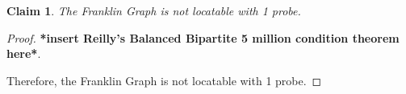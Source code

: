 \documentclass[11pt]{article}
\newtheorem{clm}{Claim}
\begin{document}
	\begin{clm}
		The Franklin Graph is not locatable with 1 probe.
	\end{clm}
	\begin{proof}
		\textbf{*insert Reilly's Balanced Bipartite 5 million condition theorem here*}.
		
		Therefore, the Franklin Graph is not locatable with 1 probe.
	\end{proof}
	\newpage
	
\end{document}
